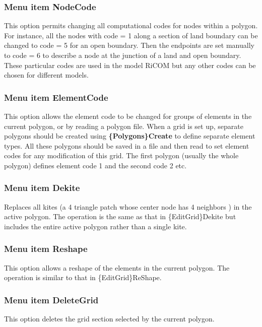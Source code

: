 \documentclass{article}
\begin{document}
\subsubsection[Menu item NodeCode]{Menu item NodeCode}
This option permits changing all computational codes for nodes within a polygon. For instance, all the nodes with code = 1 along a section of land boundary can be changed to code = 5 for an open boundary. Then the endpoints are set manually to code = 6 to describe a node at the junction of a land and open boundary. These particular codes are used in the model RiCOM but any other codes can be chosen for different models.

\subsubsection[Menu item ElementCode]{Menu item ElementCode}
This option allows the element code to be changed for groups of elements in the current polygon, or by reading a polygon file. When a grid is set up, separate polygons should be created using {\bf \{Polygons\}Create} to define separate element types. All these polygons should be saved in a file and then read to set element codes for any modification of this grid. The first polygon (usually the whole polygon) defines element code 1 and the second code 2 etc.

\subsubsection[Menu item Dekite]{Menu item Dekite}
Replaces all kites (a 4 triangle patch whose center node has 4 neighbors ) in the active polygon. The operation is the same as that in \{EditGrid\}Dekite but includes the entire active polygon rather than a single kite.

\subsubsection[Menu item Reshape]{Menu item Reshape}
This option allows a reshape of the elements in the current polygon. The operation is similar to that in \{EditGrid\}ReShape.

\subsubsection[Menu item DeleteGrid]{Menu item DeleteGrid}
This option deletes the grid section selected by the current polygon.
\end{document}
